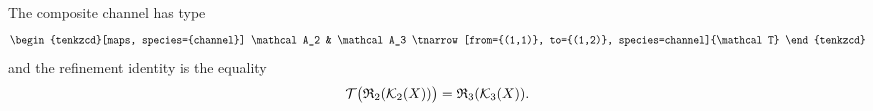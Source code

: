 \documentclass[varwidth=18cm, border=6pt]{standalone}
\begin{document}
The composite channel has type
\[
  \begin{tenkzcd}[maps, species={channel}]
    \mathcal A_2 & \mathcal A_3
    \tnarrow[from={(1,1)}, to={(1,2)}, species=channel]{\mathcal T}
  \end{tenkzcd}
\]
and the refinement identity is the equality
\[
  \mathcal T\bigl(\mathfrak R_2({\cal K}_2(X))\bigr)
  =\mathfrak R_3({\cal K}_3(X)).
\]
\end{document}
